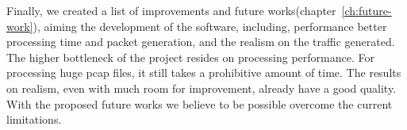 Finally, we created a list of improvements and future works(chapter~\ref{ch:future-work}), aiming the development of the software, including, performance better processing time and packet generation, and the realism on the traffic generated. The higher bottleneck of the project resides on processing performance. For processing huge pcap files, it still takes a prohibitive amount of time. The results on realism, even with much room for improvement, already have a good quality. With the proposed future works we believe to be possible overcome the current limitations.

